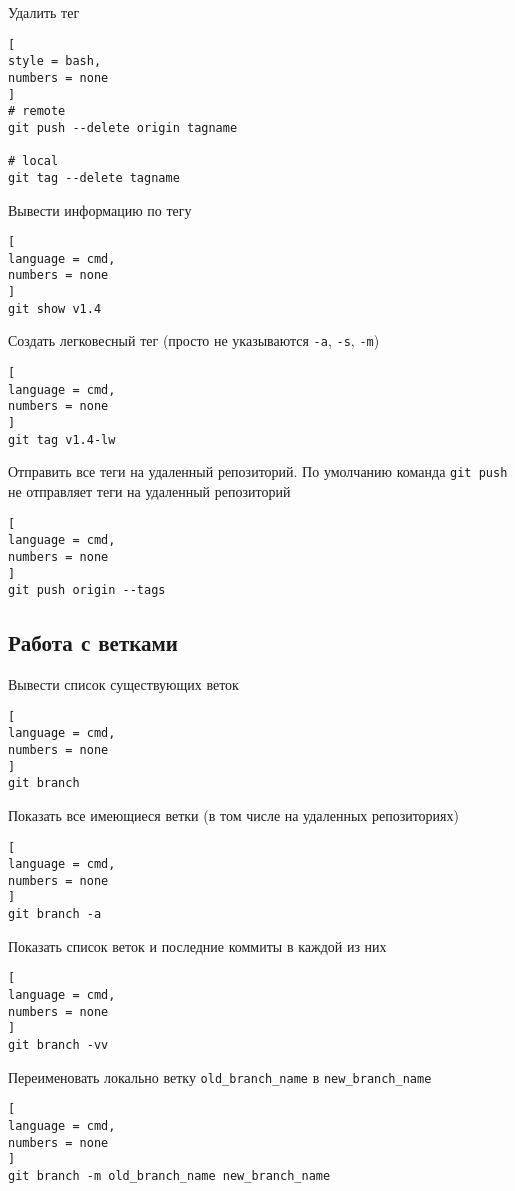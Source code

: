\documentclass[%
	11pt,
	a4paper,
	utf8,
		]{article}
\begin{document}
Удалить тег
\begin{lstlisting}[
style = bash,
numbers = none
]
# remote 
git push --delete origin tagname

# local
git tag --delete tagname
\end{lstlisting}

Вывести информацию по тегу

\begin{lstlisting}[
language = cmd,
numbers = none
]
git show v1.4
\end{lstlisting}


Создать легковесный тег (просто не указываются \texttt{-a}, \texttt{-s}, \texttt{-m})

\begin{lstlisting}[
language = cmd,
numbers = none
]
git tag v1.4-lw
\end{lstlisting}


Отправить все теги на удаленный репозиторий. По умолчанию команда \texttt{git push} не отправляет теги на удаленный репозиторий

\begin{lstlisting}[
language = cmd,
numbers = none
]
git push origin --tags
\end{lstlisting}


\subsection{Работа с ветками}

Вывести список существующих веток

\begin{lstlisting}[
language = cmd,
numbers = none
]
git branch
\end{lstlisting}

Показать все имеющиеся ветки (в том числе на удаленных репозиториях)
\begin{lstlisting}[
language = cmd,
numbers = none
]
git branch -a
\end{lstlisting}

Показать список веток и последние коммиты в каждой из них
\begin{lstlisting}[
language = cmd,
numbers = none
]
git branch -vv
\end{lstlisting}

Переименовать локально ветку \texttt{old\_branch\_name} в \texttt{new\_branch\_name}
\begin{lstlisting}[
language = cmd,
numbers = none
]
git branch -m old_branch_name new_branch_name
\end{lstlisting}
\end{document}
